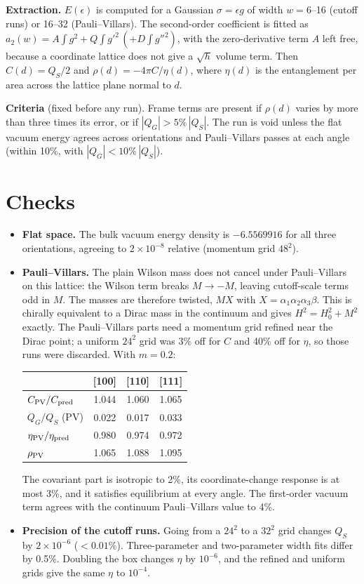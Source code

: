 \documentclass[11pt]{article}
\begin{document}
\textbf{Extraction.} $E(\epsilon)$ is computed for a Gaussian $\sigma=\epsilon g$ of width $w=6$--16 (cutoff runs) or 16--32 (Pauli--Villars). The second-order coefficient is fitted as $a_2(w)=A\!\int\!g^2+Q\!\int\!g'^2\,(+D\!\int\!g''^2)$, with the zero-derivative term $A$ left free, because a coordinate lattice does not give a $\sqrt h$ volume term. Then $C(d)=Q_S/2$ and $\rho(d)=-4\pi C/\eta(d)$, where $\eta(d)$ is the entanglement per area across the lattice plane normal to $d$.

\textbf{Criteria} (fixed before any run). Frame terms are present if $\rho(d)$ varies by more than three times its error, or if $|Q_G|>5\%\,|Q_S|$. The run is void unless the flat vacuum energy agrees across orientations and Pauli--Villars passes at each angle (within 10\%, with $|Q_G|<10\%\,|Q_S|$).

\section{Checks}
\begin{itemize}
\item \textbf{Flat space.} The bulk vacuum energy density is $-6.5569916$ for all three orientations, agreeing to $2\times10^{-8}$ relative (momentum grid $48^2$).
\item \textbf{Pauli--Villars.} The plain Wilson mass does not cancel under Pauli--Villars on this lattice: the Wilson term breaks $M\to-M$, leaving cutoff-scale terms odd in $M$. The masses are therefore twisted, $M X$ with $X=\alpha_1\alpha_2\alpha_3\beta$. This is chirally equivalent to a Dirac mass in the continuum and gives $H^2=H_0^2+M^2$ exactly. The Pauli--Villars parts need a momentum grid refined near the Dirac point; a uniform $24^2$ grid was 3\% off for $C$ and 40\% off for $\eta$, so those runs were discarded. With $m=0.2$:
\begin{center}\begin{tabular}{lccc}\toprule
& [100] & [110] & [111]\\\midrule
$C_{\rm PV}/C_{\rm pred}$ & 1.044 & 1.060 & 1.065\\
$Q_{G}/Q_{S}$ (PV) & 0.022 & 0.017 & 0.033\\
$\eta_{\rm PV}/\eta_{\rm pred}$ & 0.980 & 0.974 & 0.972\\
$\rho_{\rm PV}$ & 1.065 & 1.088 & 1.095\\\bottomrule
\end{tabular}\end{center}
The covariant part is isotropic to 2\%, its coordinate-change response is at most 3\%, and it satisfies equilibrium at every angle. The first-order vacuum term agrees with the continuum Pauli--Villars value to 4\%.
\item \textbf{Precision of the cutoff runs.} Going from a $24^2$ to a $32^2$ grid changes $Q_S$ by $2\times10^{-6}$ ($<0.01\%$). Three-parameter and two-parameter width fits differ by 0.5\%. Doubling the box changes $\eta$ by $10^{-6}$, and the refined and uniform grids give the same $\eta$ to $10^{-4}$.
\end{itemize}
\end{document}
